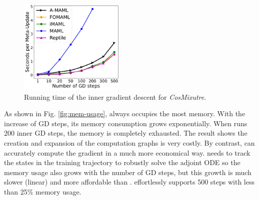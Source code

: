 \begin{figure}[!htb]
	\centering
	\includegraphics[width=0.45\textwidth]{./figs/icml22/speed-eps-converted-to.pdf}
	\caption{\small Running time of the inner gradient descent for \textit{CosMixutre}.}
	\label{fig:speed}
\end{figure}

As shown in Fig. \ref{fig:mem-usage}, \maml always occupies the most memory. With the increase of GD steps, its memory consumption grows exponentially. When \maml runs 200 inner GD steps, the memory is completely exhausted.  The result shows the creation and expansion of the computation graphs is very costly. By contrast,  \ours can accurately compute the gradient in a much more economical way. \ours needs to track the states in the training trajectory to robustly solve the adjoint ODE so the memory usage also grows with the number of GD steps, but this growth is much slower (linear) and more affordable than \maml. \ours effortlessly supports 500 steps with less than 25\% memory usage.

